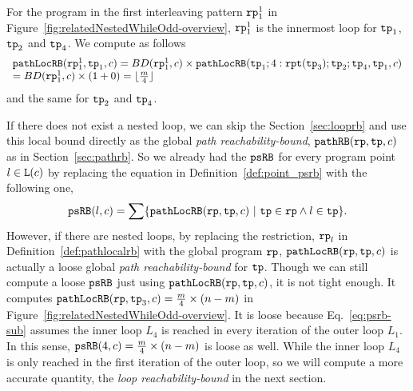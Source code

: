 For the program in the first interleaving pattern $\mathtt{rp}_1^1$ in Figure~\ref{fig:relatedNestedWhileOdd-overview}, $\mathtt{rp}_1^1$ is the innermost loop for $\mathtt{tp}_1$, $\mathtt{tp}_2$ and $\mathtt{tp}_4$.
We compute as follows
 $$
 \begin{array}{l}
  \mathtt{pathLocRB}(\mathtt{rp}_1^1, \mathtt{tp}_1, c) 
  = BD(\mathtt{rp}_1^1, c) \times \mathtt{pathLocRB}(\mathtt{tp}_1; 4:\mathtt{rpt}(\mathtt{tp}_3); \mathtt{tp}_2; \mathtt{tp}_4, \mathtt{tp}_1, c)\\
  = BD(\mathtt{rp}_1^1, c) \times (1 + 0) = \lfloor \frac{m}{4} \rfloor 
 \end{array}
 $$
  and the same for $\mathtt{tp}_2$ and $\mathtt{tp}_4$.

If there does not exist a nested loop, we can skip the Section~\ref{sec:looprb} and use this local bound directly as the global \emph{path reachability-bound}, $\mathtt{pathRB}(\mathtt{rp}, \mathtt{tp}, c)$ as in Section~\ref{sec:pathrb}. 
 So we already had the $\mathtt{psRB}$ for every program point $l \in \mathtt{L}(c)$ by replacing the equation in Definition~\ref{def:point_psrb} with the following one,
 \begin{equation}
 \label{eq:psrb-sub}
 \psRB(l, c) = 
 \sum
 \left\{ \outinB(\rprog, \tpath, c) ~\vert~ \tpath \in \rprog \land 
 l \in \tpath \right\}.
 \end{equation}
 However, if there are nested loops, 
 by replacing the restriction, $\mathtt{rp}_l$ in Definition~\ref{def:pathlocalrb} with the global program $\mathtt{rp}$, $\mathtt{pathLocRB}(\mathtt{rp}, \mathtt{tp}, c)$ is actually a loose global \emph{path reachability-bound} for $\mathtt{tp}$. Though we can still compute a loose $\mathtt{psRB}$ just using $\mathtt{pathLocRB}(\mathtt{rp}, \mathtt{tp}, c)$, it is not tight enough. 
It computes
$\mathtt{pathLocRB}(\mathtt{rp}, \mathtt{tp}_3, c) = \frac{m}{4} \times (n - m)$ in Figure~\ref{fig:relatedNestedWhileOdd-overview}.
It is loose because Eq.~\ref{eq:psrb-sub} assumes the inner loop $L_4$ is reached in every iteration of the outer loop $L_1$. In this sense, $\mathtt{psRB}(4, c) = \frac{m}{4} \times (n - m)$ is loose as well.
While the inner loop $L_4$ is only reached in the first iteration of the outer loop,
so we will compute a more accurate quantity, the \emph{loop reachability-bound} in the next section.